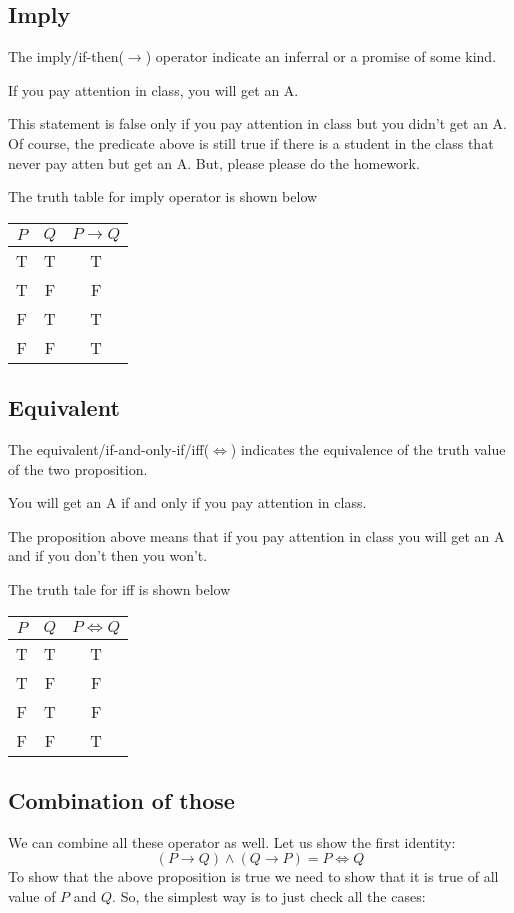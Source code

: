 \documentclass[a4paper, 12pt]{article}
\theoremstyle{examplestyle}
\begin{document}
\begin{multicols}{2}
\subsection*{Imply}
The imply/if-then($\to$) operator indicate an inferral or a promise of some kind.
\begin{center}
	If you pay attention in class, you will get an A.
\end{center}
This statement is false only if you pay attention in class but you didn't get an A. Of course, the predicate above is still true if there is a student in the class that never pay atten but get an A. But, please please do the homework.

The truth table for imply operator is shown below
\begin{center}
	\begin{tabular}{c|c||c}
		\hline\hline $P$ & $Q$ & $P \to Q$ \\ 
		\hline        T  &  T  &      T      \\ 
		\hline        T  &  F  &      F      \\ 
		\hline        F  &  T  &      T      \\ 
		\hline        F  &  F  &      T      \\ 
		\hline\hline 
	\end{tabular} 
\end{center}

\subsection*{Equivalent}
The equivalent/if-and-only-if/iff($\iff$) indicates the equivalence of the truth value of the two proposition.
\begin{center}
	You will get an A if and only if you pay attention in class.
\end{center}
The proposition above means that if you pay attention in class you will get an A and if you don't then you won't.

The truth tale for iff is shown below
\begin{center}
	\begin{tabular}{c|c||c}
		\hline\hline $P$ & $Q$ & $P \iff Q$ \\ 
		\hline        T  &  T  &      T      \\ 
		\hline        T  &  F  &      F      \\ 
		\hline        F  &  T  &      F      \\ 
		\hline        F  &  F  &      T      \\ 
		\hline\hline 
	\end{tabular} 
\end{center}
\subsection*{Combination of those}
We can combine all these operator as well. Let us show the first identity:
\[
	(P \to Q) \land (Q \to P) = P \iff Q
\]
To show that the above proposition is true we need to show that it is true of all value of $P$ and $Q$. So, the simplest way is to just check all the cases:
\end{multicols}
\end{document}
